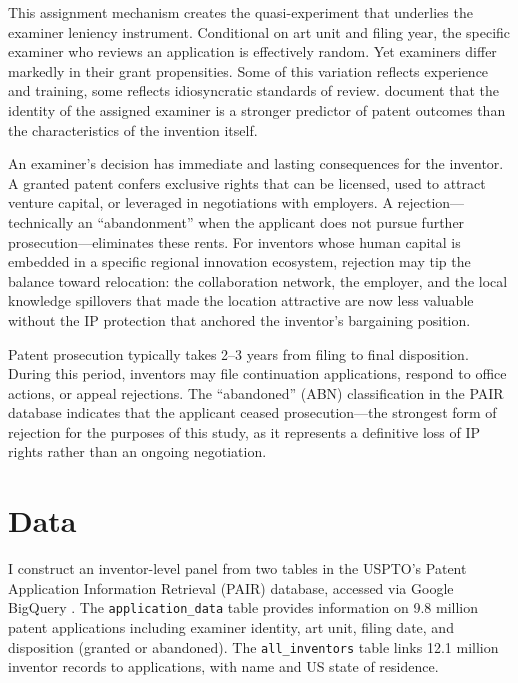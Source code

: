 \documentclass[12pt]{article}
\begin{document}
This assignment mechanism creates the quasi-experiment that underlies the examiner leniency instrument. Conditional on art unit and filing year, the specific examiner who reviews an application is effectively random. Yet examiners differ markedly in their grant propensities. Some of this variation reflects experience and training, some reflects idiosyncratic standards of review. \citet{lemley2012} document that the identity of the assigned examiner is a stronger predictor of patent outcomes than the characteristics of the invention itself.

An examiner's decision has immediate and lasting consequences for the inventor. A granted patent confers exclusive rights that can be licensed, used to attract venture capital, or leveraged in negotiations with employers. A rejection---technically an ``abandonment'' when the applicant does not pursue further prosecution---eliminates these rents. For inventors whose human capital is embedded in a specific regional innovation ecosystem, rejection may tip the balance toward relocation: the collaboration network, the employer, and the local knowledge spillovers that made the location attractive are now less valuable without the IP protection that anchored the inventor's bargaining position.

Patent prosecution typically takes 2--3 years from filing to final disposition. During this period, inventors may file continuation applications, respond to office actions, or appeal rejections. The ``abandoned'' (ABN) classification in the PAIR database indicates that the applicant ceased prosecution---the strongest form of rejection for the purposes of this study, as it represents a definitive loss of IP rights rather than an ongoing negotiation.


\section{Data}
\label{sec:data}

I construct an inventor-level panel from two tables in the USPTO's Patent Application Information Retrieval (PAIR) database, accessed via Google BigQuery \citep{marco2015}. The \texttt{application\_data} table provides information on 9.8 million patent applications including examiner identity, art unit, filing date, and disposition (granted or abandoned). The \texttt{all\_inventors} table links 12.1 million inventor records to applications, with name and US state of residence.
\end{document}
